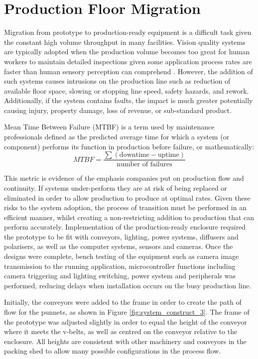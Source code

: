 \documentclass[fleqn,twoside,12pt]{report}
\begin{document}
\section{Production Floor Migration}

Migration from prototype to production-ready equipment is a difficult task given the constant high volume throughput in many facilities. Vision quality systems are typically adopted when the production volume becomes too great for human workers to maintain detailed inspections given some application process rates are faster than human sensory perception can comprehend \cite{sofu, duan}. However, the addition of such systems causes intrusions on the production line such as reduction of available floor space, slowing or stopping line speed, safety hazards, and rework. Additionally, if the system contains faults, the impact is much greater potentially causing injury, property damage, loss of revenue, or sub-standard product.

Mean Time Between Failure (MTBF) is a term used by maintenance professionals defined as the predicted average time for which a system (or component) performs its function in production before failure, or mathematically:
\begin{equation}
	MTBF = \frac{\sum (\text{downtime} - \text{uptime})}{\text{number of failures}}
\end{equation}

This metric is evidence of the emphasis companies put on production flow and continuity. If systems under-perform they are at risk of being replaced or eliminated in order to allow production to produce at optimal rates. Given these risks to the system adoption, the process of transition must be performed in an efficient manner, whilst creating a non-restricting addition to production that can perform accurately. Implementation of the production-ready enclosure required the prototype to be fit with conveyors, lighting, power systems, diffusers and polarisers, as well as the computer systems, sensors and cameras. Once the designs were complete, bench testing of the equipment such as camera image transmission to the running application, microcontroller functions including camera triggering and lighting switching, power system and peripherals was performed, reducing delays when installation occurs on the busy production line.


Initially, the conveyors were added to the frame in order to create the path of flow for the punnets, as shown in Figure \ref{fig:system_construct_3}. The frame of the prototype was adjusted slightly in order to equal the height of the conveyor where it meets the v-belts, as well as centred on the conveyor relative to the enclosure. All heights are consistent with other machinery and conveyors in the packing shed to allow many possible configurations in the process flow. 
\end{document}
